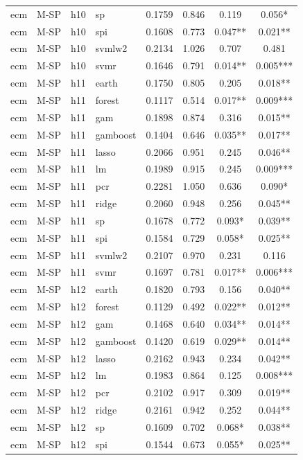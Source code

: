 \begin{ThreePartTable}
\begin{longtable}[t]{llclcccc}
ecm & M-SP & h10 & sp & 0.1759 & 0.846 & 0.119 & 0.056*\\
ecm & M-SP & h10 & spi & 0.1608 & 0.773 & 0.047** & 0.021**\\
ecm & M-SP & h10 & svmlw2 & 0.2134 & 1.026 & 0.707 & 0.481\\
ecm & M-SP & h10 & svmr & 0.1646 & 0.791 & 0.014** & 0.005***\\
\addlinespace
ecm & M-SP & h11 & earth & 0.1750 & 0.805 & 0.205 & 0.018**\\
ecm & M-SP & h11 & forest & 0.1117 & 0.514 & 0.017** & 0.009***\\
ecm & M-SP & h11 & gam & 0.1898 & 0.874 & 0.316 & 0.015**\\
ecm & M-SP & h11 & gamboost & 0.1404 & 0.646 & 0.035** & 0.017**\\
ecm & M-SP & h11 & lasso & 0.2066 & 0.951 & 0.245 & 0.046**\\
ecm & M-SP & h11 & lm & 0.1989 & 0.915 & 0.245 & 0.009***\\
ecm & M-SP & h11 & pcr & 0.2281 & 1.050 & 0.636 & 0.090*\\
ecm & M-SP & h11 & ridge & 0.2060 & 0.948 & 0.256 & 0.045**\\
ecm & M-SP & h11 & sp & 0.1678 & 0.772 & 0.093* & 0.039**\\
ecm & M-SP & h11 & spi & 0.1584 & 0.729 & 0.058* & 0.025**\\
ecm & M-SP & h11 & svmlw2 & 0.2107 & 0.970 & 0.231 & 0.116\\
ecm & M-SP & h11 & svmr & 0.1697 & 0.781 & 0.017** & 0.006***\\
\addlinespace
ecm & M-SP & h12 & earth & 0.1820 & 0.793 & 0.156 & 0.040**\\
ecm & M-SP & h12 & forest & 0.1129 & 0.492 & 0.022** & 0.012**\\
ecm & M-SP & h12 & gam & 0.1468 & 0.640 & 0.034** & 0.014**\\
ecm & M-SP & h12 & gamboost & 0.1420 & 0.619 & 0.029** & 0.014**\\
ecm & M-SP & h12 & lasso & 0.2162 & 0.943 & 0.234 & 0.042**\\
ecm & M-SP & h12 & lm & 0.1983 & 0.864 & 0.125 & 0.008***\\
ecm & M-SP & h12 & pcr & 0.2102 & 0.917 & 0.309 & 0.019**\\
ecm & M-SP & h12 & ridge & 0.2161 & 0.942 & 0.252 & 0.044**\\
ecm & M-SP & h12 & sp & 0.1609 & 0.702 & 0.068* & 0.038**\\
ecm & M-SP & h12 & spi & 0.1544 & 0.673 & 0.055* & 0.025**\\

\end{longtable}
\end{ThreePartTable}
